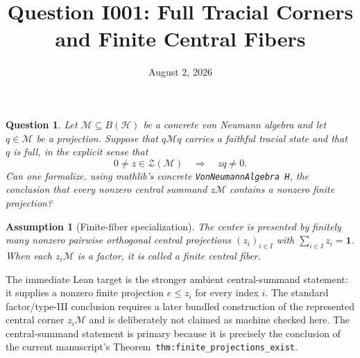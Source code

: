 \documentclass[11pt,reqno]{amsart}
\title{Question I001: Full Tracial Corners and Finite Central Fibers}
\date{August 2, 2026}
\newtheorem{question}{Question}
\newtheorem{assumption}{Assumption}
\newcommand{\cH}{\mathcal H}
\newcommand{\cM}{\mathcal M}
\newcommand{\cZ}{\mathcal Z}
\newcommand{\id}{\mathbf 1}
\begin{document}
\maketitle

\begin{question}
Let $\cM\subseteq B(\cH)$ be a concrete von Neumann algebra and let
$q\in\cM$ be a projection.  Suppose that $q\cM q$ carries a faithful
tracial state and that $q$ is full, in the explicit sense that
\begin{equation}
  0\neq z\in\cZ(\cM)\quad\Longrightarrow\quad zq\neq0.
  \label{eq:question_fullness}
\end{equation}
Can one formalize, using mathlib's concrete
\texttt{VonNeumannAlgebra H}, the conclusion that every nonzero central
summand $z\cM$ contains a nonzero finite projection?
\end{question}

\begin{assumption}[Finite-fiber specialization]
The center is presented by finitely many nonzero pairwise orthogonal central
projections $(z_i)_{i\in I}$ with $\sum_{i\in I}z_i=\id$.  When each
$z_i\cM$ is a factor, it is called a finite central fiber.
\end{assumption}

The immediate Lean target is the stronger ambient central-summand statement:
it supplies a nonzero finite projection $e\leq z_i$ for every index $i$.
The standard factor/type-III conclusion requires a later bundled construction
of the represented central corner $z_i\cM$ and is deliberately not claimed as
machine checked here.  The central-summand statement is primary because it is
precisely the conclusion of the current manuscript's
Theorem~\texttt{thm:finite\_projections\_exist}.
\end{document}
